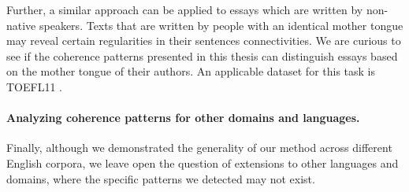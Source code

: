 Further, a similar approach can be applied to essays which are written by non-native speakers. 
Texts that are written by people with an identical mother tongue may reveal certain regularities in their sentences connectivities.  
We are curious to see if the coherence patterns presented in this thesis can distinguish essays based on the mother tongue of their authors. 
An applicable dataset for this task is TOEFL11 \cite{blanchard11}. 

\paragraph{Analyzing coherence patterns for other domains and languages.}
Finally, although we demonstrated the generality of our method across different English corpora, we leave open the question of extensions to other languages and domains, where the specific patterns we detected may not exist. 



